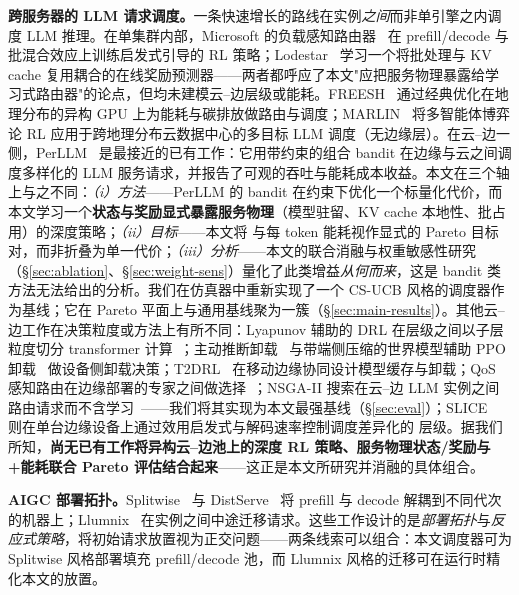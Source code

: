 \textbf{跨服务器的 LLM 请求调度。}一条快速增长的路线在实例\emph{之间}而非单引擎之内调度 LLM 推理。在单集群内部，Microsoft 的负载感知路由器~\cite{jain2024router} 在 prefill/decode 与批混合效应上训练启发式引导的 RL 策略；Lodestar~\cite{lim2026lodestar} 学习一个将批处理与 KV cache 复用耦合的在线奖励预测器——两者都呼应了本文"应把服务物理暴露给学习式路由器"的论点，但均未建模云--边层级或能耗。FREESH~\cite{he2025freesh} 通过经典优化在地理分布的异构 GPU 上为能耗与碳排放做路由与调度；MARLIN~\cite{moore2026marlin} 将多智能体博弈论 RL 应用于跨地理分布云数据中心的多目标 LLM 调度（无边缘层）。在云--边一侧，PerLLM~\cite{yang2024perllm} 是最接近的已有工作：它用带约束的组合 bandit 在边缘与云之间调度多样化的 LLM 服务请求，并报告了可观的吞吐与能耗成本收益。本文在三个轴上与之不同：\emph{（i）方法}——PerLLM 的 bandit 在约束下优化一个标量化代价，而本文学习一个\textbf{状态与奖励显式暴露服务物理}（模型驻留、KV cache 本地性、批占用）的深度策略；\emph{（ii）目标}——本文将 \slo{} 与每 token 能耗视作显式的 Pareto 目标对，而非折叠为单一代价；\emph{（iii）分析}——本文的联合消融与权重敏感性研究（\S\ref{sec:ablation}、\S\ref{sec:weight-sens}）量化了此类增益\emph{从何而来}，这是 bandit 类方法无法给出的分析。我们在仿真器中重新实现了一个 CS-UCB 风格的调度器作为基线；它在 Pareto 平面上与通用基线聚为一簇（\S\ref{sec:main-results}）。其他云--边工作在决策粒度或方法上有所不同：Lyapunov 辅助的 DRL 在层级之间以子层粒度切分 transformer 计算~\cite{younesi2025lyapunov}；主动推断卸载~\cite{he2024activeinference} 与带端侧压缩的世界模型辅助 PPO 卸载~\cite{zhang2026worldmodel} 做设备侧卸载决策；T2DRL~\cite{xu2025t2drl} 在移动边缘协同设计模型缓存与卸载；QoS 感知路由在边缘部署的专家之间做选择~\cite{yang2025qosrouting}；NSGA-II 搜索在云--边 LLM 实例之间路由请求而不含学习~\cite{yu2025llmrouting}——我们将其实现为本文最强基线（\S\ref{sec:eval}）；SLICE~\cite{chow2025slice} 则在单台边缘设备上通过效用启发式与解码速率控制调度差异化的 \slo{} 层级。据我们所知，\textbf{尚无已有工作将异构云--边池上的深度 RL 策略、服务物理状态/奖励与 \slo{}+能耗联合 Pareto 评估结合起来}——这正是本文所研究并消融的具体组合。

\textbf{AIGC 部署拓扑。}Splitwise~\cite{patel2024splitwise} 与 DistServe~\cite{zhong2024distserve} 将 prefill 与 decode 解耦到不同代次的机器上；Llumnix~\cite{sun2024llumnix} 在实例之间中途迁移请求。这些工作设计的是\emph{部署拓扑}与\emph{反应式策略}，将初始请求放置视为正交问题——两条线索可以组合：本文调度器可为 Splitwise 风格部署填充 prefill/decode 池，而 Llumnix 风格的迁移可在运行时精化本文的放置。

